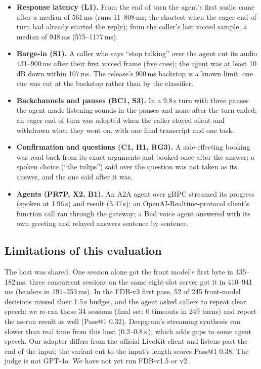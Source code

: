 \begin{itemize}
\item \textbf{Response latency (L1).} From the end of turn the agent's first audio came after a median of
561\,ms (runs 11--808\,ms; the shortest when the eager end of turn had already started the reply); from the
caller's last voiced sample, a median of 948\,ms (575--1177\,ms).
\item \textbf{Barge-in (S1).} A caller who says ``stop talking'' over the agent cut its audio 431--900\,ms after
their first voiced frame (five cues); the agent was at least 10\,dB down within 107\,ms. The release's
900\,ms backstop is a known limit: one cue was cut at the backstop rather than by the classifier.
\item \textbf{Backchannels and pauses (BC1, S3).} In a 9.8\,s turn with three pauses the agent made listening
sounds in the pauses and none after the turn ended; an eager end of turn was adopted when the caller stayed
silent and withdrawn when they went on, with one final transcript and one task.
\item \textbf{Confirmation and questions (C1, H1, RG3).} A side-effecting booking was read back from its exact
arguments and booked once after the answer; a spoken choice (``the tulips'') said over the question was not
taken as its answer, and the one said after it was.
\item \textbf{Agents (PR7P, X2, B1).} An A2A agent over gRPC streamed its progress (spoken at 1.96\,s) and
result (3.47\,s); an OpenAI-Realtime-protocol client's function call ran through the gateway; a Bud voice agent
answered with its own greeting and relayed answers sentence by sentence.
\end{itemize}

\subsection{Limitations of this evaluation}\label{sec:eval-limits}

The host was shared. One session alone got the front model's first byte in 135--182\,ms; three concurrent
sessions on the same eight-slot server got it in 410--941\,ms (headers in 191--253\,ms). In the FDB-v3 first pass, 52 of 245 front-model decisions missed their 1.5\,s budget, and
the agent asked callers to repeat clear speech; we re-ran those 34 sessions (final set: 0 timeouts in 249 turns)
and report the as-run result as well (Pass@1 0.32). Deepgram's streaming synthesis ran slower than real time
from this host (0.2--0.8$\times$), which adds gaps to some agent speech. Our adapter differs from the official
LiveKit client and listens past the end of the input; the variant cut to the input's length scores Pass@1 0.38.
The judge is not GPT-4o. We have not yet run FDB-v1.5 or v2.
